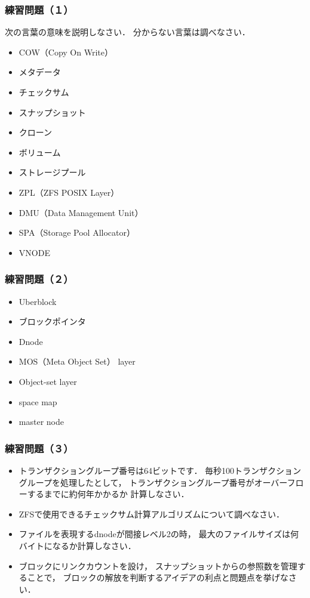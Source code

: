 \documentclass[unicode]{beamer}                   %
\begin{document}
\begin{frame}[fragile]
  \frametitle{練習問題（１）}
  次の言葉の意味を説明しなさい．
  分からない言葉は調べなさい．
  \begin{itemize}
  \item COW（Copy On Write）
  \item メタデータ
  \item チェックサム
  \item スナップショット
  \item クローン
  \item ボリューム
  \item ストレージプール
  \item ZPL（ZFS POSIX Layer）
  \item DMU（Data Management Unit）
  \item SPA（Storage Pool Allocator）
  \item VNODE
  \end{itemize}
  \vfill
\end{frame}

\begin{frame}[fragile]
  \frametitle{練習問題（２）}
  \begin{itemize}
  \item Uberblock
  \item ブロックポインタ
  \item Dnode
  \item MOS（Meta Object Set） layer
  \item Object-set layer
  \item space map
  \item master node
  \end{itemize}
  \vfill
\end{frame}

\begin{frame}[fragile]
  \frametitle{練習問題（３）}
  \begin{itemize}
  \item トランザクショングループ番号は64ビットです．
    毎秒100トランザクショングループを処理したとして，
    トランザクショングループ番号がオーバーフローするまでに約何年かかるか
    計算しなさい．
  \item ZFSで使用できるチェックサム計算アルゴリズムについて調べなさい．
  \item ファイルを表現するdnodeが間接レベル2の時，
    最大のファイルサイズは何バイトになるか計算しなさい．
  \item ブロックにリンクカウントを設け，
    スナップショットからの参照数を管理することで，
    ブロックの解放を判断するアイデアの利点と問題点を挙げなさい．
  \end{itemize}
  \vfill
\end{frame}

\end{document}
